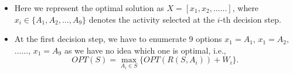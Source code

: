 \documentclass[mathserif]{beamer}
\begin{document}
{\begin{figure}
\end{figure}

\begin{itemize}
	\item Here we represent the optimal solution as $X=[x_1, x_2, ......]$, where $x_i\in \{A_1, A_2, ..., A_9\}$ denotes the activity selected at the $i$-th decision step. 
	\item At the first decision step, we have to enumerate 9 options $x_1 = A_1$, $x_1 = A_2$, ......, $x_1 = A_9$ as we have no idea which one is optimal, i.e.,  
\[
OPT(S) = \max_{A_i \in S}\{OPT( R(S, A_i) ) + W_i\}.
\]

\end{itemize}

}


\end{document}
